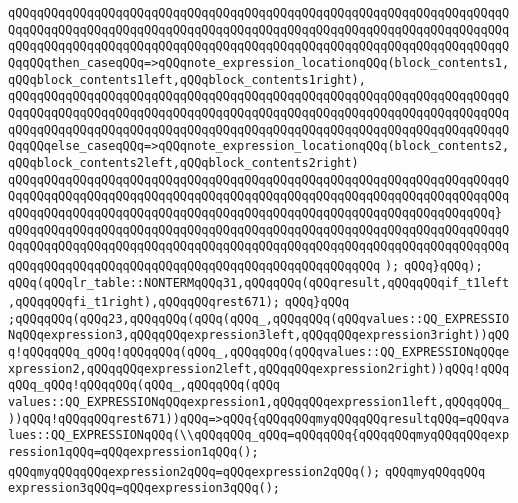 \verb|qQQqqQQqqQQqqQQqqQQqqQQqqQQqqQQqqQQqqQQqqQQqqQQqqQQqqQQqqQQqqQQqqQQqqQQqqQQqqQQqqQQqqQQqqQQqqQQqqQQqqQQqqQQqqQQqqQQqqQQqqQQqqQQqqQQqqQQqqQQqqQQqqQQqqQQqqQQqqQQqqQQqqQQqqQQqqQQqqQQqqQQqqQQqqQQqqQQqqQQqqQQqqQQqqQQqqQQqthen_caseqQQq=>qQQqnote_expression_locationqQQq(block_contents1,qQQqblock_contents1left,qQQqblock_contents1right),|\newline
\verb|qQQqqQQqqQQqqQQqqQQqqQQqqQQqqQQqqQQqqQQqqQQqqQQqqQQqqQQqqQQqqQQqqQQqqQQqqQQqqQQqqQQqqQQqqQQqqQQqqQQqqQQqqQQqqQQqqQQqqQQqqQQqqQQqqQQqqQQqqQQqqQQqqQQqqQQqqQQqqQQqqQQqqQQqqQQqqQQqqQQqqQQqqQQqqQQqqQQqqQQqqQQqqQQqqQQqqQQqelse_caseqQQq=>qQQqnote_expression_locationqQQq(block_contents2,qQQqblock_contents2left,qQQqblock_contents2right)|\newline
\verb|qQQqqQQqqQQqqQQqqQQqqQQqqQQqqQQqqQQqqQQqqQQqqQQqqQQqqQQqqQQqqQQqqQQqqQQqqQQqqQQqqQQqqQQqqQQqqQQqqQQqqQQqqQQqqQQqqQQqqQQqqQQqqQQqqQQqqQQqqQQqqQQqqQQqqQQqqQQqqQQqqQQqqQQqqQQqqQQqqQQqqQQqqQQqqQQqqQQqqQQqqQQqqQQq}|\newline
\verb|qQQqqQQqqQQqqQQqqQQqqQQqqQQqqQQqqQQqqQQqqQQqqQQqqQQqqQQqqQQqqQQqqQQqqQQqqQQqqQQqqQQqqQQqqQQqqQQqqQQqqQQqqQQqqQQqqQQqqQQqqQQqqQQqqQQqqQQqqQQqqQQqqQQqqQQqqQQqqQQqqQQqqQQqqQQqqQQqqQQqqQQqqQQqqQQq|\newline
\verb|);|\newline
\verb|qQQq}qQQq);|\newline
\verb|qQQq(qQQqlr_table::NONTERMqQQq31,qQQqqQQq(qQQqresult,qQQqqQQqif_t1left,qQQqqQQqfi_t1right),qQQqqQQqrest671);|\newline
\verb|qQQq}qQQq|\newline
\verb|;qQQqqQQq(qQQq23,qQQqqQQq(qQQq(qQQq_,qQQqqQQq(qQQqvalues::QQ_EXPRESSIONqQQqexpression3,qQQqqQQqexpression3left,qQQqqQQqexpression3right))qQQq!qQQqqQQq_qQQq!qQQqqQQq(qQQq_,qQQqqQQq(qQQqvalues::QQ_EXPRESSIONqQQqexpression2,qQQqqQQqexpression2left,qQQqqQQqexpression2right))qQQq!qQQqqQQq_qQQq!qQQqqQQq(qQQq_,qQQqqQQq(qQQq|\newline
\verb|values::QQ_EXPRESSIONqQQqexpression1,qQQqqQQqexpression1left,qQQqqQQq_))qQQq!qQQqqQQqrest671))qQQq=>qQQq{qQQqqQQqmyqQQqqQQqresultqQQq=qQQqvalues::QQ_EXPRESSIONqQQq(\\qQQqqQQq_qQQq=qQQqqQQq{qQQqqQQqmyqQQqqQQqexpression1qQQq=qQQqexpression1qQQq();|\newline
\verb|qQQqmyqQQqqQQqexpression2qQQq=qQQqexpression2qQQq();|\newline
\verb|qQQqmyqQQqqQQq|\newline
\verb|expression3qQQq=qQQqexpression3qQQq();|\newline
